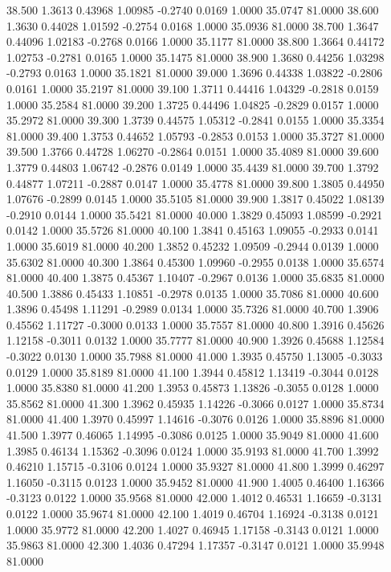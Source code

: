   38.500   1.3613   0.43968   1.00985  -0.2740   0.0169   1.0000  35.0747  81.0000
  38.600   1.3630   0.44028   1.01592  -0.2754   0.0168   1.0000  35.0936  81.0000
  38.700   1.3647   0.44096   1.02183  -0.2768   0.0166   1.0000  35.1177  81.0000
  38.800   1.3664   0.44172   1.02753  -0.2781   0.0165   1.0000  35.1475  81.0000
  38.900   1.3680   0.44256   1.03298  -0.2793   0.0163   1.0000  35.1821  81.0000
  39.000   1.3696   0.44338   1.03822  -0.2806   0.0161   1.0000  35.2197  81.0000
  39.100   1.3711   0.44416   1.04329  -0.2818   0.0159   1.0000  35.2584  81.0000
  39.200   1.3725   0.44496   1.04825  -0.2829   0.0157   1.0000  35.2972  81.0000
  39.300   1.3739   0.44575   1.05312  -0.2841   0.0155   1.0000  35.3354  81.0000
  39.400   1.3753   0.44652   1.05793  -0.2853   0.0153   1.0000  35.3727  81.0000
  39.500   1.3766   0.44728   1.06270  -0.2864   0.0151   1.0000  35.4089  81.0000
  39.600   1.3779   0.44803   1.06742  -0.2876   0.0149   1.0000  35.4439  81.0000
  39.700   1.3792   0.44877   1.07211  -0.2887   0.0147   1.0000  35.4778  81.0000
  39.800   1.3805   0.44950   1.07676  -0.2899   0.0145   1.0000  35.5105  81.0000
  39.900   1.3817   0.45022   1.08139  -0.2910   0.0144   1.0000  35.5421  81.0000
  40.000   1.3829   0.45093   1.08599  -0.2921   0.0142   1.0000  35.5726  81.0000
  40.100   1.3841   0.45163   1.09055  -0.2933   0.0141   1.0000  35.6019  81.0000
  40.200   1.3852   0.45232   1.09509  -0.2944   0.0139   1.0000  35.6302  81.0000
  40.300   1.3864   0.45300   1.09960  -0.2955   0.0138   1.0000  35.6574  81.0000
  40.400   1.3875   0.45367   1.10407  -0.2967   0.0136   1.0000  35.6835  81.0000
  40.500   1.3886   0.45433   1.10851  -0.2978   0.0135   1.0000  35.7086  81.0000
  40.600   1.3896   0.45498   1.11291  -0.2989   0.0134   1.0000  35.7326  81.0000
  40.700   1.3906   0.45562   1.11727  -0.3000   0.0133   1.0000  35.7557  81.0000
  40.800   1.3916   0.45626   1.12158  -0.3011   0.0132   1.0000  35.7777  81.0000
  40.900   1.3926   0.45688   1.12584  -0.3022   0.0130   1.0000  35.7988  81.0000
  41.000   1.3935   0.45750   1.13005  -0.3033   0.0129   1.0000  35.8189  81.0000
  41.100   1.3944   0.45812   1.13419  -0.3044   0.0128   1.0000  35.8380  81.0000
  41.200   1.3953   0.45873   1.13826  -0.3055   0.0128   1.0000  35.8562  81.0000
  41.300   1.3962   0.45935   1.14226  -0.3066   0.0127   1.0000  35.8734  81.0000
  41.400   1.3970   0.45997   1.14616  -0.3076   0.0126   1.0000  35.8896  81.0000
  41.500   1.3977   0.46065   1.14995  -0.3086   0.0125   1.0000  35.9049  81.0000
  41.600   1.3985   0.46134   1.15362  -0.3096   0.0124   1.0000  35.9193  81.0000
  41.700   1.3992   0.46210   1.15715  -0.3106   0.0124   1.0000  35.9327  81.0000
  41.800   1.3999   0.46297   1.16050  -0.3115   0.0123   1.0000  35.9452  81.0000
  41.900   1.4005   0.46400   1.16366  -0.3123   0.0122   1.0000  35.9568  81.0000
  42.000   1.4012   0.46531   1.16659  -0.3131   0.0122   1.0000  35.9674  81.0000
  42.100   1.4019   0.46704   1.16924  -0.3138   0.0121   1.0000  35.9772  81.0000
  42.200   1.4027   0.46945   1.17158  -0.3143   0.0121   1.0000  35.9863  81.0000
  42.300   1.4036   0.47294   1.17357  -0.3147   0.0121   1.0000  35.9948  81.0000
